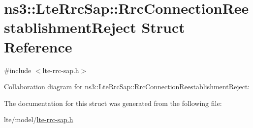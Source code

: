 \hypertarget{structns3_1_1LteRrcSap_1_1RrcConnectionReestablishmentReject}{}\section{ns3\+:\+:Lte\+Rrc\+Sap\+:\+:Rrc\+Connection\+Reestablishment\+Reject Struct Reference}
\label{structns3_1_1LteRrcSap_1_1RrcConnectionReestablishmentReject}


{\ttfamily \#include $<$lte-\/rrc-\/sap.\+h$>$}



Collaboration diagram for ns3\+:\+:Lte\+Rrc\+Sap\+:\+:Rrc\+Connection\+Reestablishment\+Reject\+:


The documentation for this struct was generated from the following file\+:\begin{DoxyCompactItemize}
\item 
lte/model/\hyperlink{lte-rrc-sap_8h}{lte-\/rrc-\/sap.\+h}\end{DoxyCompactItemize}
